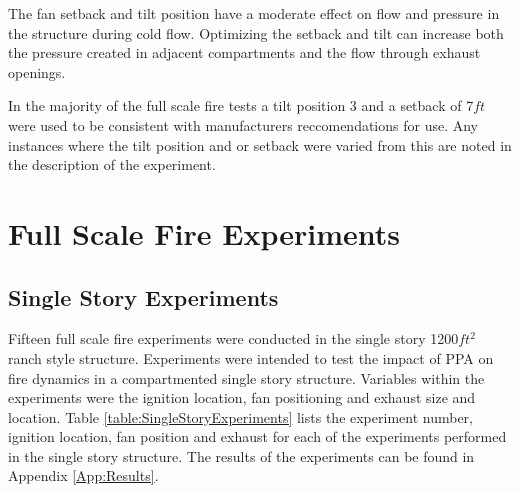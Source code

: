 \documentclass{article}
\begin{document}
The fan setback and tilt position have a moderate effect on flow and pressure in the structure during cold flow. Optimizing the setback and tilt can increase both the pressure created in adjacent compartments and the flow through exhaust openings. 

In the majority of the full scale fire tests a tilt position 3 and a setback of 7$ft$ were used to be consistent with manufacturers reccomendations for use. Any instances where the tilt position and or setback were varied from this are noted in the description of the experiment. 

\clearpage

\section{Full Scale Fire Experiments}

\subsection{Single Story Experiments} \label{SingleStoryExp}

Fifteen full scale fire experiments were conducted in the single story 1200$ft^2$ ranch style structure. Experiments were intended to test the impact of PPA on fire dynamics in a compartmented single story structure. Variables within the experiments were the ignition location, fan positioning and exhaust size and location. Table \ref{table:SingleStoryExperiments} lists the experiment number, ignition location, fan position and exhaust for each of the experiments performed in the single story structure. The results of the experiments can be found in Appendix \ref{App:Results}.

\mbox{}
\end{document}
